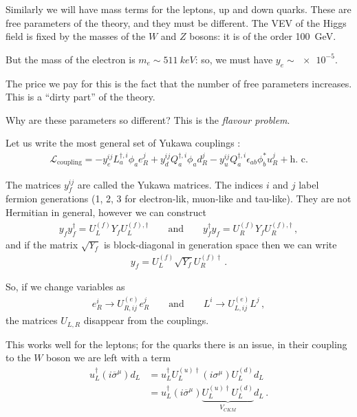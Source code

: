 \documentclass[main.tex]{subfiles}
\begin{document}
Similarly we will have mass terms for the leptons, up and down quarks.
These are free parameters of the theory, and they must be different. 
The VEV of the Higgs field is fixed by the masses of the \(W\) and \(Z\) bosons: it is of the order \SI{100}{GeV}.

But the mass of the electron is \(m_e \sim \SI{511}{keV}\): so, we must have \(y_e \sim \num{e-5}\). 

The price we pay for this is the fact that the number of free parameters increases. This is a ``dirty part'' of the theory.

Why are these parameters so different? This is the \emph{flavour problem}.


Let us write the most general set of Yukawa couplings \cite[eq.\ 18.24]{peskinConceptsElementaryParticle2019}: 
%
\begin{align}
\mathscr{L} _{\text{coupling}}
= - y^{ij}_{e} L ^{\dag, i}_{a} \phi_{a} e^{j}_{R}
+ y^{ij}_{d} Q ^{\dag, i}_{a} \phi_{a} d^{j}_{R}
- y^{ij}_{u} Q ^{\dag, i}_{a} \epsilon_{ab} \phi_{b}^{*} u^{j}_{R} 
+ \text{h.\ c.}
\end{align}

The matrices \(y^{ij}_{f}\) are called the Yukawa matrices. The indices \(i \) and \(j\) label fermion generations (1, 2, 3 for electron-lik, muon-like and tau-like).
They are not Hermitian in general, however we can construct 
%
\begin{align}
y_f y_f ^\dag = U_L^{(f)} Y_f U_L^{(f), \dag} 
\qquad \text{and} \qquad
y_f ^\dag y_f = U_R^{(f)} Y_f U_R^{(f), \dag}
\,,
\end{align}
%
and if the matrix \(\sqrt{Y_f}\) is block-diagonal in generation space then we can write 
%
\begin{align}
y_f = U_L^{(f)} \sqrt{Y_f} U_R^{(f)\dag}
\,.
\end{align}

So, if we change variables as 
%
\begin{align}
e^{i}_{R} \to U^{(e)}_{R, ij} e^{j}_{R}
\qquad \text{and} \qquad
L^{i} \to U^{(e)}_{L, ij} L^{j}
\,,
\end{align}
%
the matrices \(U_{L, R}\) disappear from the couplings.

This works well for the leptons; for the quarks there is an issue, in their coupling to the \(W\) boson we are left with a term 
%
\begin{align}
u ^\dag_{L} (i \overline{\sigma}^{\mu }) d_L &= u ^\dag _L U_L^{(u)\dag} (i \sigma^{\mu }) U_L^{(d)} d_L  \\
&= u ^\dag_L (i \overline{\sigma}^{\mu }) \underbrace{U_L^{(u)\dag}U_L^{(d)}}_{V_{CKM}} d_L
\,.
\end{align}
\end{document}
